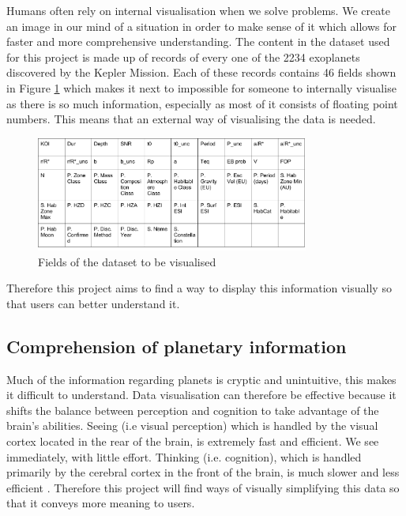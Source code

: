 Humans often rely on internal visualisation when we solve problems. We create an
image in our mind of a situation in order to make sense of it
\cite{visualisingpiggott} which allows for faster and more comprehensive
understanding. The content in the dataset used
for this project is made up of records of every one of the 2234 exoplanets
discovered by the Kepler Mission. Each of these records contains 46 fields shown in Figure \ref{fig:fields} which
makes it next to impossible for someone to internally visualise as there is so
much information, especially as most of it consists of floating point numbers.
This means that an external
way of visualising the data is needed.
\begin{figure}[H]
  \centering
      \includegraphics[width=0.8\textwidth]{images/data.png}
  \caption{Fields of the dataset to be visualised}
  \label{fig:fields}
\end{figure}
 Therefore this project aims to find a way to display this information visually so that users can better understand it.
\subsection{Comprehension of planetary information}
Much of the information regarding planets is cryptic and unintuitive, this makes
it difficult to understand. Data visualisation can therefore be effective
because it shifts the balance between perception and cognition to take advantage
of
the brain's abilities. Seeing (i.e visual perception) which is handled by the
visual cortex located in the rear of the brain, is extremely fast and efficient.
We see immediately, with little effort. Thinking (i.e. cognition), which is
handled primarily by the cerebral cortex in the front of the brain, is much
slower and less efficient \cite{few}. Therefore this project will find ways of visually simplifying this data so that it conveys more meaning to users. 


